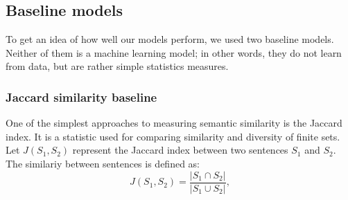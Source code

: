 \documentclass[10pt, a4paper]{article}
\begin{document}
\begin{table}[h!]
%
%
%
\subsection{Baseline models}

To get an idea of how well our models perform, we used two baseline models.
Neither of them is a machine learning model; in other words, they do not learn from data, but are rather simple statistics measures.

\subsubsection{Jaccard similarity baseline}

One of the simplest approaches to measuring semantic similarity is the Jaccard index.
It is a statistic used for comparing similarity and diversity of finite sets.
Let $J(S_1, S_2)$ represent the Jaccard index between two sentences $S_1$ and $S_2$.
The similariy between sentences is defined as:
\begin{equation}
	\label{eq:jaccard}
	J(S_1, S_2) = \frac{|S_1 \cap S_2|}{|S_1 \cup S_2|},
\end{equation}


\end{table}
\end{document}
